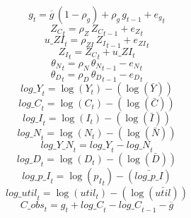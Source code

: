 \begin{dmath}
{{g}}_{t}={{\overline{g}}}\, \left(1-{{\rho_g}}\right)+{{\rho_g}}\, {{g}}_{t-1}+{{e_g}}_{t}
\end{dmath}
\begin{dmath}
{{Z_C}}_{t}={{\rho_Z}}\, {{Z_C}}_{t-1}+{{e_Z}}_{t}
\end{dmath}
\begin{dmath}
{u\_ZI}_{t}={{\rho_{ZI}}}\, {{Z_I}}_{t-1}+{{e_{ZI}}}_{t}
\end{dmath}
\begin{dmath}
{{Z_I}}_{t}={{Z_C}}_{t}+{u\_ZI}_{t}
\end{dmath}
\begin{dmath}
{{\theta_N}}_{t}={{\rho_N}}\, {{\theta_N}}_{t-1}-{{e_N}}_{t}
\end{dmath}
\begin{dmath}
{{\theta_D}}_{t}={{\rho_D}}\, {{\theta_D}}_{t-1}-{{e_D}}_{t}
\end{dmath}
\begin{dmath}
{log\_Y}_{t}=\log\left({{Y}}_{t}\right)-(\log\left(\bar{{Y}}\right))
\end{dmath}
\begin{dmath}
{log\_C}_{t}=\log\left({{C}}_{t}\right)-(\log\left(\bar{{C}}\right))
\end{dmath}
\begin{dmath}
{log\_I}_{t}=\log\left({{I}}_{t}\right)-(\log\left(\bar{{I}}\right))
\end{dmath}
\begin{dmath}
{log\_N}_{t}=\log\left({{N}}_{t}\right)-(\log\left(\bar{{N}}\right))
\end{dmath}
\begin{dmath}
{log\_Y\_N}_{t}={log\_Y}_{t}-{log\_N}_{t}
\end{dmath}
\begin{dmath}
{log\_D}_{t}=\log\left({{D}}_{t}\right)-(\log\left(\bar{{D}}\right))
\end{dmath}
\begin{dmath}
{log\_p\_I}_{t}=\log\left({{p_I}}_{t}\right)-(\bar{log\_p\_I})
\end{dmath}
\begin{dmath}
{log\_util}_{t}=\log\left({{util}}_{t}\right)-(\log\left(\bar{{util}}\right))
\end{dmath}
\begin{dmath}
{C\_obs}_{t}={{g}}_{t}+{log\_C}_{t}-{log\_C}_{t-1}-{{\overline{g}}}
\end{dmath}
